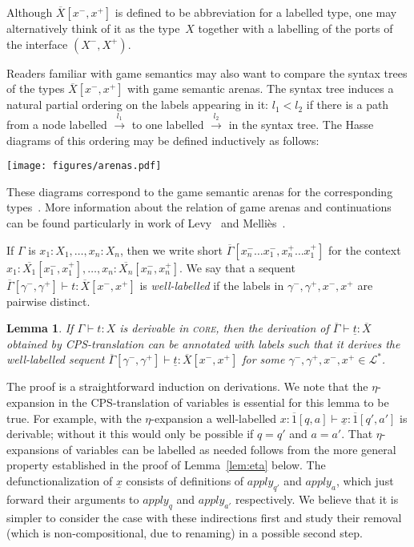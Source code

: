 \documentclass{LMCS}
\theoremstyle{definition}
\theoremstyle{plain}
\newtheorem{lemma}[thm]{Lemma}
\newcommand{\Capply}{\textit{apply}}
\newcommand{\I}[2]{#1 \colon #2}
\newcommand{\SeqTm}[3]{#1 \vdash #2 \colon #3}
\newcommand{\LL}{\mathcal{L}}
\newcommand{\xto}{\xrightarrow}
\newcommand{\cps}[1]{\underline{#1}}
\begin{document}
Although $\overline X[x^-, x^+]$  is defined to be
abbreviation for a labelled type, 
one may alternatively think of it
as the type~$X$ together with a labelling of the ports of the interface 
$(X^-, X^+)$.

Readers familiar with game semantics may also want to compare the
syntax trees of the types $\overline{X}[x^-,x^+]$ with game semantic
arenas. 
The syntax tree induces a natural partial ordering on the labels appearing in
it:  $l_1 \lt l_2$ if there is a path from a node labelled $\xto{l_1}$ to one
labelled $\xto{l_2}$ in the syntax tree.
The Hasse diagrams of this ordering may be defined inductively as
follows:\\
\begin{center}
  \texttt{[image: figures/arenas.pdf]}
\end{center}
These diagrams correspond to the game semantic arenas for the corresponding
types~\cite{HylandOng}.
More information about the relation of game arenas and continuations can be
found particularly in work of Levy~\cite{cbpv} and Melli\`es~\cite{mellies12}.


If $\Gamma$ is $\I {x_1} {X_1},\dots,\I {x_n} {X_n}$, then we write
short $\overline \Gamma[x_n^-\dots x_1^-, x_n^+\dots x_1^+]$ for
the context
$\I {x_1} {\overline{X_1}[x^-_1, x^+_1]}, 
\dots, 
\I {x_n} {\overline{X_n}[x^-_n,x^+_n]}$.
We say that a sequent 
$\SeqTm{\overline{\Gamma}[\gamma^-, \gamma^+]}{t}{\overline X[x^-,x^+]}$ 
is \emph{well-labelled} if the labels in $\gamma^-, \gamma^+, x^-,
x^+$ are pairwise distinct.

\begin{lemma}
  \label{lem:cps}
  If\/ $\SeqTm{\Gamma}{t}{X}$ is derivable in \textsc{core},
  then 
  the derivation of $\SeqTm{\overline \Gamma}{\cps t}{\overline X}$ obtained by CPS-translation 
  can be annotated
  with labels such that it derives the 
  well-labelled sequent\/
  $\SeqTm{\overline \Gamma [\gamma^-, \gamma^+]}{\cps t}{\overline X [x^-, x^+]}$
  for some $\gamma^-, \gamma^+, x^-, x^+ \in \LL^*$.
\end{lemma}
The proof is a straightforward induction on derivations. 
We note that the $\eta$-expansion 
in the CPS-translation of variables is essential for this lemma
to be true.  For example, with the $\eta$-expansion a well-labelled
$\SeqTm{\I x {\overline 1[q,a]}}{\cps x}{\overline 1[q',a']}$
is derivable;
without it this would only be possible if $q=q'$ and $a=a'$.
That $\eta$-expansions of variables can be labelled as needed follows
from the more general property established in the proof of Lemma~\ref{lem:eta} below.
The defunctionalization of $\cps x$ consists of definitions of
$\Capply_{q'}$ and $\Capply_{a}$, which just forward their arguments
to $\Capply_{q}$ and $\Capply_{a'}$ respectively.
We believe that it is simpler to consider the case with these
indirections first and study their removal (which is non-compositional,
due to renaming) in a possible second step.
\end{document}
